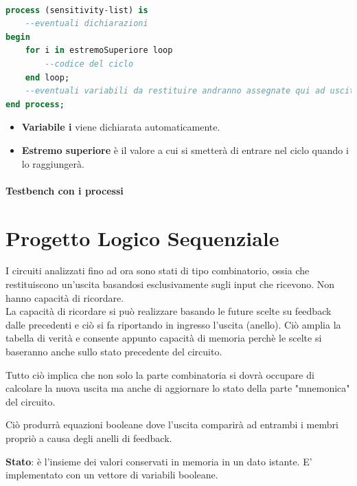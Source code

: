 \documentclass[a4paper]{book}
\begin{document}
\begin{lstlisting}[language=VHDL]

process (sensitivity-list) is
	--eventuali dichiarazioni
begin 
	for i in estremoSuperiore loop
		--codice del ciclo
	end loop;
	--eventuali variabili da restituire andranno assegnate qui ad uscite o segnali cos' da non essere perse all'uscita dal ciclo.
end process;
\end{lstlisting}

\begin{itemize}

\item\textbf{Variabile i} viene dichiarata automaticamente.

\item\textbf{Estremo superiore} è il valore a cui si smetterà di entrare nel ciclo quando i lo raggiungerà.

\end{itemize}

\subsubsection{Testbench con i processi}

 




\chapter{Progetto Logico Sequenziale}

I circuiti analizzati fino ad ora sono stati di tipo combinatorio, ossia che restituiscono un'uscita basandosi esclusivamente sugli input che ricevono.
Non hanno capacità di ricordare. \\
La capacità di ricordare si può realizzare basando le future scelte su feedback dalle precedenti e ciò si fa riportando in ingresso l'uscita (anello).
Ciò amplia la tabella di verità e consente appunto capacità di memoria perchè le scelte si baseranno anche sullo stato precedente del circuito.

Tutto ciò implica che non solo la parte combinatoria si dovrà occupare di calcolare la nuova uscita ma anche di aggiornare lo stato della parte "mnemonica" del circuito.

Ciò produrrà equazioni booleane dove l'uscita comparirà ad entrambi i membri propriò a causa degli anelli di feedback. 

\textbf{Stato}: è l'insieme dei valori conservati in memoria in un dato istante. E' implementato con un vettore di variabili booleane.
\end{document}
